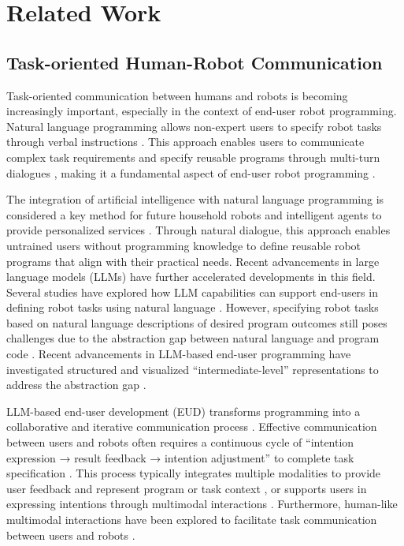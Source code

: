 \section{Related Work}
\subsection{Task-oriented Human-Robot Communication}


Task-oriented communication between humans and robots is becoming increasingly important, especially in the context of end-user robot programming. Natural language programming allows non-expert users to specify robot tasks through verbal instructions \cite{connell_verbal_2019, matuszek_learning_2013, thomason_improving_2019,ionescu_programming_2021,lauria_mobile_2002}. This approach enables users to communicate complex task requirements and specify reusable programs through multi-turn dialogues \cite{gorostiza_end-user_2011,stenmark_natural_2013,thomason_improving_2019}, making it a fundamental aspect of end-user robot programming \cite{ajaykumar_survey_2022,lieberman_end-user_2006}.

The integration of artificial intelligence with natural language programming is considered a key method for future household robots and intelligent agents to provide personalized services \cite{fischer_adaptive_2023}. 
Through natural dialogue, this approach enables untrained users without programming knowledge to define reusable robot programs that align with their practical needs.
Recent advancements in large language models (LLMs) 
\cite{wei_emergent_2022} have further accelerated developments in this field. Several studies have explored how LLM capabilities can support end-users in defining robot tasks using natural language \cite{fang_enabling_2024, gargioni_integrating_2024}. 
However, specifying robot tasks based on natural language descriptions of desired program outcomes still poses challenges due to the abstraction gap between natural language and program code \cite{liu_what_2023}.
Recent advancements in LLM-based end-user programming have investigated structured and visualized “intermediate-level” representations to address the abstraction gap \cite{liu_what_2023,ge_cocobo_2024}.

LLM-based end-user development (EUD) transforms programming into a collaborative and iterative communication process \cite{karli_alchemist_2024,fischer_adaptive_2023}.
Effective communication between users and robots often requires a continuous cycle of ``intention expression → result feedback → intention adjustment'' to complete task specification \cite{glassman_designing_2023}. This process typically integrates multiple modalities to provide user feedback and represent program or task context \cite{huang_vipo_2020,zhang_patterns_2021,fang_enabling_2024}, or supports users in expressing intentions through multimodal interactions \cite{porfirio_sketching_2023}. Furthermore, human-like multimodal interactions have been explored to facilitate task communication between users and robots \cite{higger_toward_2023,huang_gestures_2024}.



